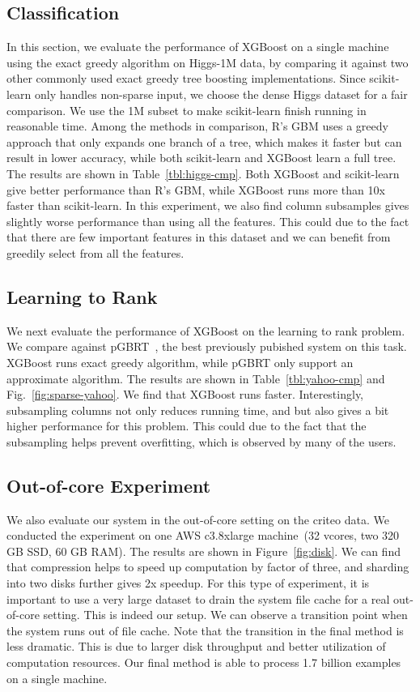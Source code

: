 \subsection{Classification}

In this section, we evaluate the performance of XGBoost on a single machine using the exact greedy algorithm on Higgs-1M data, by comparing it against two other commonly used exact greedy tree boosting implementations. Since scikit-learn only handles non-sparse input, we choose the dense Higgs dataset for a fair comparison. We use the 1M subset to make scikit-learn finish running in reasonable time. Among the methods in comparison, R's GBM uses a greedy approach that only expands one branch of a tree, which makes it faster but can result in lower accuracy, while both scikit-learn and XGBoost learn a full tree. The results are shown in Table~\ref{tbl:higgs-cmp}.
Both XGBoost and scikit-learn give better performance than R's GBM, while XGBoost runs more than 10x faster than scikit-learn. In this experiment, we also find column subsamples gives slightly worse performance than using all the features. This could due to the fact that there are few important features in this dataset and we can benefit from greedily select from all the features.

\subsection{Learning to Rank}

We next evaluate the performance of XGBoost on the learning to rank problem. We compare against pGBRT~\cite{tyree2011parallel}, the best previously pubished system on this task. XGBoost runs exact greedy algorithm, while pGBRT only support an approximate algorithm. The results are shown in Table~\ref{tbl:yahoo-cmp} and Fig.~\ref{fig:sparse-yahoo}.
We find that XGBoost runs faster. Interestingly, subsampling columns not only reduces running time, and but also gives a bit higher performance for this problem. This could due to the fact that the subsampling helps prevent overfitting, which is observed by many of the users.

\subsection{Out-of-core Experiment} We also evaluate our system in the out-of-core setting on the criteo data. We conducted the experiment on one AWS c3.8xlarge machine~(32 vcores, two 320 GB SSD, 60 GB RAM). The results are shown in Figure~\ref{fig:disk}.
We can find that compression helps to speed up computation by factor of three, and sharding into two disks further gives 2x speedup. For this type of experiment, it is important to use a very large dataset to drain the system file cache for a real out-of-core setting. This is indeed our setup. We can observe a transition point when the system runs out of file cache. Note that the transition in the final method is less dramatic. This is due to larger disk throughput and better utilization of computation resources. Our final method is able to process 1.7 billion examples on a single machine.

